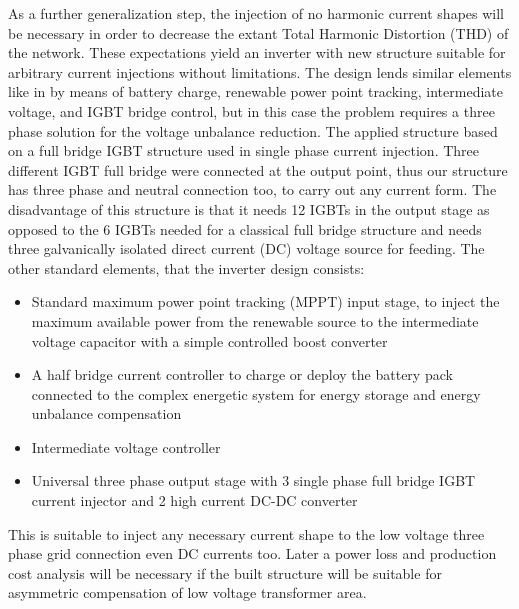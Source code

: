     As a further generalization step, the injection of no harmonic current shapes will be necessary in order to decrease the extant Total Harmonic Distortion (THD) of the network. These expectations yield an inverter with new structure suitable for arbitrary current injections without limitations. The design lends similar elements like in \cite{gorbe2012reduction} by means of battery charge, renewable power point tracking, intermediate voltage, and IGBT bridge control, but in this case the problem requires a three phase solution for the voltage unbalance reduction. The applied structure based on a full bridge IGBT structure used in single phase current injection. Three different IGBT full bridge were connected at the output point, thus our structure has three phase and neutral connection too, to carry out any current form. The disadvantage of this structure is that it needs 12 IGBTs in the output stage as opposed to the 6 IGBTs needed for a classical full bridge structure and needs three galvanically isolated direct current (DC) voltage source for feeding.
    The other standard elements, that the inverter design consists:


        \begin{itemize}
            \item Standard maximum power point tracking (MPPT) input stage, to inject the maximum available power from the renewable source to the intermediate voltage capacitor with a simple controlled boost converter
            \item A half bridge current controller to charge or deploy the battery pack connected to the complex energetic system for energy storage and energy unbalance compensation
            \item Intermediate voltage controller
            \item Universal three phase output stage with 3 single phase full bridge IGBT current injector and 2 high current DC-DC converter
        \end{itemize}
    This is suitable to inject any necessary current shape to the low voltage three phase grid connection even DC currents too. Later a power loss and production cost analysis will be necessary if the built structure will be suitable for asymmetric compensation of low voltage transformer area.



